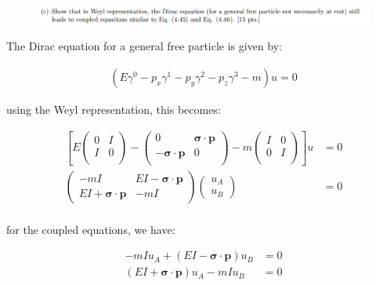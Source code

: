 \documentclass[11pt]{article}
\theoremstyle{definition}
\begin{document}
\begin{figure}[H]
    \centering
    \includegraphics[scale = 0.5]{2c.png}
\end{figure}

The Dirac equation for a general free particle is given by:

\begin{align}
    (E\gamma^0 - p_x\gamma^1 - p_y\gamma^2 - p_z\gamma^3 - m)u=0
\end{align}

using the Weyl representation, this becomes:

\begin{align}
    \left[E
    \begin{pmatrix}
        0 & I\\
        I & 0\\
    \end{pmatrix}
    - 
    \begin{pmatrix}
        0 & \mathbf{\sigma \cdot p}\\
        -\mathbf{\sigma \cdot p} & 0\\
    \end{pmatrix}
    - m
    \begin{pmatrix}
        I & 0 \\
        0 & I\\
    \end{pmatrix}
    \right]u&=0\\
        \begin{pmatrix}
            -mI & EI - \mathbf{\sigma \cdot p}\\
            EI + \mathbf{\sigma \cdot p} & -mI
        \end{pmatrix}
        \begin{pmatrix}
            u_A\\
            u_B
        \end{pmatrix}
        &=
        0
        \\
\end{align}

for the coupled equations, we have:

\begin{align}
    -mI u_A + (EI-\mathbf{\sigma \cdot p}) u_B &= 0 \\
    (EI + \mathbf{\sigma \cdot p}) u_A - mI u_B &= 0\\
\end{align}
\end{document}
